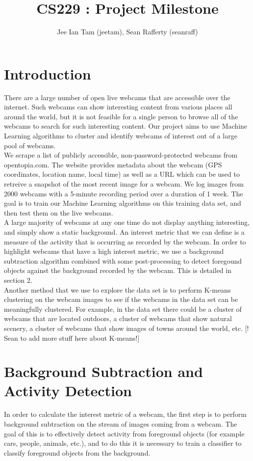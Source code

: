 \documentclass{article}
\begin{document}
\title{CS229 : Project Milestone}
\author{Jee Ian Tam (jeetam), Sean Rafferty (seanraff)}

\section{Introduction}
There are a large number of open live webcams that are accessible over the internet. Such webcams can show interesting content from various places all around the world, but it is not feasible for a single person to browse all of the webcams to search for such interesting content. Our project aims to use Machine Learning algorithms to cluster and identify webcams of interest out of a large pool of webcams. \\

We scrape a list of publicly accessible, non-password-protected webcams from opentopia.com. The website provides metadata about the webcam (GPS coordinates, location name, local time) as well as a URL which can be used to retreive a snapshot of the most recent image for a webcam. We log images from 2000 webcams with a 5-minute recording period over a duration of 1 week. The goal is to train our Machine Learning algorithms on this training data set, and then test them on the live webcams. \\

A large majority of webcams at any one time do not display anything interesting, and simply show a static background. An interest metric that we can define is a measure of the activity that is occurring as recorded by the webcam. In order to highlight webcams that have a high interest metric, we use a background subtraction algorithm combined with some post-processing to detect foregound objects against the background recorded by the webcam. This is detailed in section 2. \\

Another method that we use to explore the data set is to perform K-means clustering on the webcam images to see if the webcams in the data set can be meaningfully clustered. For example, in the data set there could be a cluster of webcams that are located outdoors, a cluster of webcams that show natural scenery, a cluster of webcams that show images of towns around the world, etc. [! Sean to add more stuff here about K-means!] \\ 



\newpage
\section{Background Subtraction and Activity Detection}
In order to calculate the interest metric of a webcam, the first step is to perform background subtraction on the stream of images coming from a webcam. The goal of this is to effectively detect activity from foreground objects (for example cars, people, animals, etc.), and to do this it is necessary to train a classifier to classify foreground objects from the background. \\
\end{document}
